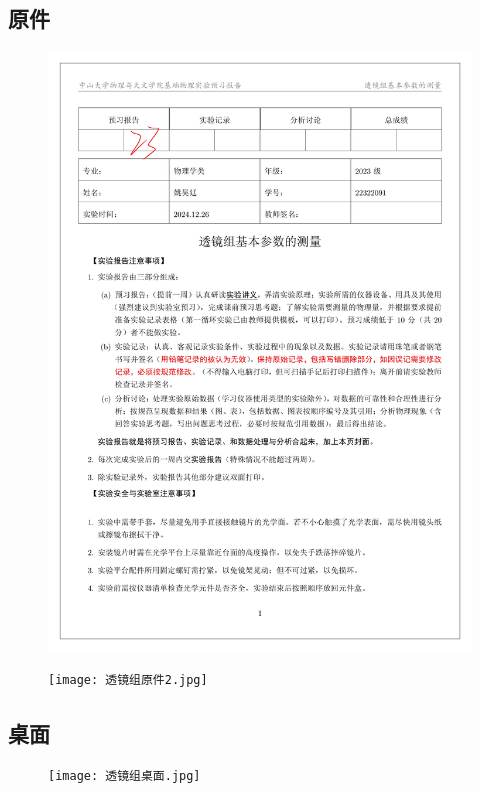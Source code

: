 \documentclass[dvipsnames, svgnames,a4paper,11pt]{article}
\begin{document}
\appendix
\appendixpage
\addappheadtotoc
%
\subsection*{原件}
%
\begin{figure}[H]
	\centering
	\includegraphics[width=\textwidth]{透镜组原件1.jpg}
	
\end{figure}
\begin{figure}[H]
	\centering
	\texttt{[image: 透镜组原件2.jpg]}
	
\end{figure}

\subsection*{桌面}
\begin{figure}[H]
	\texttt{[image: 透镜组桌面.jpg]}
\end{figure}
\end{document}

